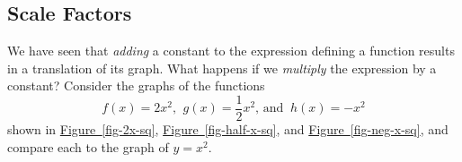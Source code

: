 \documentclass[10pt,]{book}
\theoremstyle{plain}
\theoremstyle{definition}
\theoremstyle{definition}
\theoremstyle{definition}
\theoremstyle{definition}
\theoremstyle{definition}
\numberwithin{equation}{section}
\newcommand{\hrulethin}  {\noalign{\hrule height 0.04em}}
\newcommand{\hrulethick} {\noalign{\hrule height 0.11em}}
\newcounter{figstack}
\newcounter{figindex}
\newlength\fight
\newcommand\pushValignCaptionBottom[5][b]{%
\stepcounter{figstack}%
\expandafter\def\csname %
figalign\romannumeral\value{figstack}\endcsname{#1}%
\expandafter\def\csname %
figtype\romannumeral\value{figstack}\endcsname{#2}%
\expandafter\def\csname %
figwd\romannumeral\value{figstack}\endcsname{#3}%
\expandafter\def\csname %
figcontent\romannumeral\value{figstack}\endcsname{#4}%
\expandafter\def\csname %
figcap\romannumeral\value{figstack}\endcsname{#5}%
\setbox0=\hbox{%
\begin{#2}{#3}#4\end{#2}}%
\ifdim\dimexpr\ht0+\dp0\relax>\fight\global\setlength{\fight}{%
\dimexpr\ht0+\dp0\relax}\fi%
}
\newcommand\popValignCaptionBottom{%
\setcounter{figindex}{0}%
\hfill%
\whiledo{\value{figindex}<\value{figstack}}{%
\stepcounter{figindex}%
\def\tmp{\csname figwd\romannumeral\value{figindex}\endcsname}%
\begin{\csname figtype\romannumeral\value{figindex}\endcsname}[t]{\tmp}%
\centering%
\stackinset{c}{}%
{\csname figalign\romannumeral\value{figindex}\endcsname}{}%
{\csname figcontent\romannumeral\value{figindex}\endcsname}%
{\rule{0pt}{\fight}}\par%
\csname figcap\romannumeral\value{figindex}\endcsname%
\end{\csname figtype\romannumeral\value{figindex}\endcsname}%
\hfill%
}%
\setcounter{figstack}{0}%
\setlength{\fight}{0pt}%
\hfill%
}
\begin{document}
\subsection[Scale Factors]{Scale Factors}\label{subsection-44}

    We have seen that \emph{adding} a constant to the expression defining a function results in a translation of its graph. What happens if we \emph{multiply} the expression by a constant? Consider the graphs of the functions
    \begin{equation*}
        f(x)= 2x^2 \text{, } ~g(x)= \frac{1}{2}x^2 \text{, and } ~h(x) = −x^2
    \end{equation*}
    shown in \hyperref[fig-2x-sq]{Figure~\ref{fig-2x-sq}}, \hyperref[fig-half-x-sq]{Figure~\ref{fig-half-x-sq}}, and \hyperref[fig-neg-x-sq]{Figure~\ref{fig-neg-x-sq}}, and compare each to the graph of \(y = x^2\).
%
\leavevmode%
\par
\end{document}
